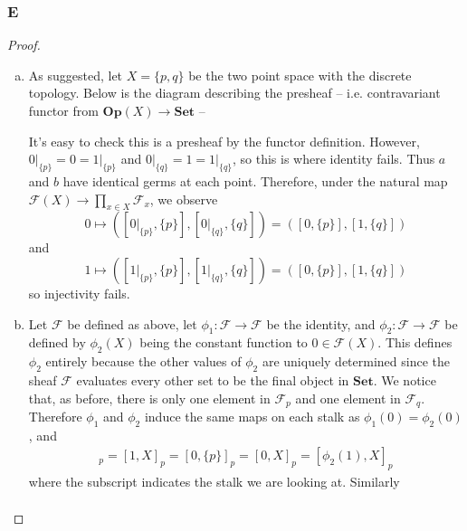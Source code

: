 \documentclass{article}
\newcommand{\fF}{\mathscr{F}}
\DeclareMathOperator{\res}{res}
\newcommand{\Set}{\mathbf{Set}} %
\newcommand{\Op}{\mathbf{Op}} %
\let\emptyset\varnothing
\begin{document}
\subsubsection{E}\label{2.4.E}
\begin{proof}
    \begin{enumerate}[(a)]
        \item As suggested, let $X=\{p,q\}$ be the two point space with the discrete topology. Below is the diagram describing the presheaf -- i.e. contravariant functor from $\Op(X)\to \Set$ -- 
        \begin{center}
        \end{center}
        It's easy to check this is a presheaf by the functor definition. However, $0\vert_{\{p\}}=0=1\vert_{\{p\}}$ and $0\vert_{\{q\}}=1=1\vert_{\{q\}}$, so this is where identity fails. Thus $a$ and $b$ have identical germs at each point. Therefore, under the natural map $\fF(X)\to \prod_{x\in X} \fF_x$, we observe
        \[
        0\mapsto ([0\vert_{\{p\}},\{p\}],[0\vert_{\{q\}},\{q\}])=([0,\{p\}],[1,\{q\}])
        \]
        and
        \[
        1\mapsto ([1\vert_{\{p\}},\{p\}],[1\vert_{\{q\}},\{q\}])=([0,\{p\}],[1,\{q\}])
        \]
        so injectivity fails.
        \item 
        Let $\fF$ be defined as above, let $\phi_1:\fF\to \fF$ be the identity, and $\phi_2:\fF\to \fF$ be defined by $\phi_2(X)$ being the constant function to $0\in \fF(X)$. This defines $\phi_2$ entirely because the other values of $\phi_2$ are uniquely determined since the sheaf $\fF$ evaluates every other set to be the final object in $\Set$. We notice that, as before, there is only one element in $\fF_p$ and one element in $\fF_q$. Therefore $\phi_1$ and $\phi_2$ induce the same maps on each stalk as $\phi_1(0)=\phi_2(0)$, and
        \begin{align*}
            [\phi_1(1),X]_p=[1,X]_p=[0,\{p\}]_p=[0,X]_p=[\phi_2(1),X]_p
        \end{align*}
        where the subscript indicates the stalk we are looking at. Similarly
        \begin{align*}

\end{align*}
\end{enumerate}
\end{proof}
\end{document}

